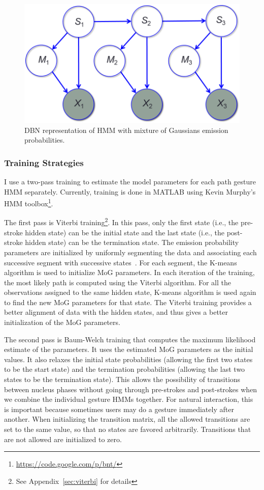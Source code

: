 \begin{figure}[tbh]
\centering
\includegraphics[width=0.5\columnwidth]{figures/mog.png}
\caption{DBN representation of HMM with mixture of
Gaussians emission probabilities.}
\label{fig:mog}
\end{figure}

\subsubsection{Training Strategies}
I use a two-pass training to estimate the model parameters for each path
gesture HMM separately. Currently, training is done in MATLAB using Kevin
Murphy's HMM toolbox\footnote{\url{https://code.google.com/p/bnt/}}.

The first pass is Viterbi training\footnote{See Appendix~\ref{sec:viterbi} for
details}.
In this pass, only the first state (i.e., the pre-stroke hidden state) can be the initial state and the last state
(i.e., the post-stroke hidden state) can be the termination state. The emission
probability parameters are initialized by uniformly segmenting the data and
associating each successive segment with successive states~\cite{young1994}. For
each segment, the K-means algorithm is used to initialize MoG parameters. In
each iteration of the training, the most likely path is computed using the
Viterbi algorithm. For all the observations assigned to the same hidden
state, K-means algorithm is used again to find the new MoG parameters for
that state. The Viterbi training provides a better alignment of data with the
hidden states, and thus gives a better initialization of the MoG parameters. 

The second pass is Baum-Welch training that computes the maximum likelihood
estimate of the parameters.
It uses the estimated MoG parameters as the initial values. It also relaxes the
initial state probabilities (allowing the first two states to be the start
state) and the termination probabilities (allowing the last two states to be the
termination state). This allows the possibility of transitions between nucleus
phases without going through pre-strokes and post-strokes when we combine the
individual gesture HMMs together. For natural interaction, this is important
because sometimes users may do a gesture immediately after another. When
initializing the transition matrix, all the allowed transitions are set to the same value, so that no states are favored arbitrarily. Transitions that are not allowed are initialized to zero.


